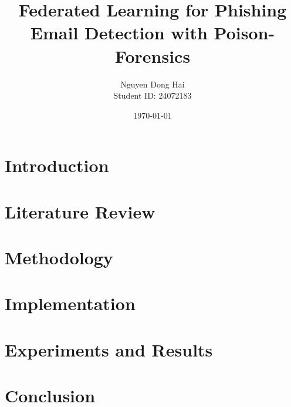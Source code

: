 \documentclass[12pt,a4paper]{report}
\title{Federated Learning for Phishing Email Detection with Poison-Forensics}
\author{Nguyen Dong Hai \\ Student ID: 24072183}
\date{\today}
\begin{document}
\maketitle
\tableofcontents

\chapter{Introduction}
% 

\chapter{Literature Review}
% 

\chapter{Methodology}
% 

\chapter{Implementation}
% 

\chapter{Experiments and Results}
% 

\chapter{Conclusion}
% 



\end{document}
